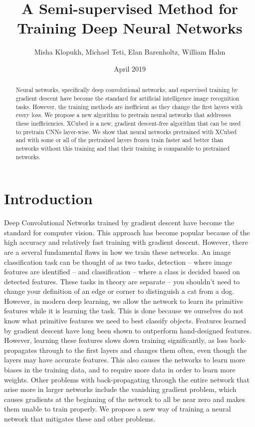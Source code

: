 \documentclass[twocolumn]{article}
\title{A Semi-supervised Method for Training Deep Neural Networks}
\author{Misha Klopukh, Michael Teti, Elan Barenholtz, William Hahn}
\date{April 2019}
\begin{document}
\maketitle




\begin{abstract}
    Neural networks, specifically deep convolutional networks, and supervised training by gradient descent have become the standard for artificial intelligence image recognition tasks. However, the training methods are inefficient as they change the first layers with every loss. We propose a new algorithm to pretrain neural networks that addresses these inefficiencies. XCubed is a new, gradient descent-free algorithm that can be used to pretrain CNNs layer-wise. We show that neural networks pretrained with XCubed and with some or all of the pretrained layers frozen train faster and better than networks without this training and that their training is comparable to pretrained networks.
\end{abstract}

\section{Introduction}

Deep Convolutional Networks trained by gradient descent have become the standard for computer vision. This approach has become popular because of the high accuracy and relatively fast training with gradient descent.\cite{alexnet}\cite{Lecun98gradient} However, there are a several fundamental flaws in how we train these networks. An image classification task can be thought of as two tasks, detection -- where image features are identified -- and classification -- where a class is decided based on detected features. These tasks in theory are separate -- you shouldn't need to change your definition of an edge or corner to distinguish a cat from a dog.\cite{cowardtowards} However, in modern deep learning, we allow the network to learn its primitive features while it is learning the task. This is done because we ourselves do not know what primitive features we need to best classify objects. Features learned by gradient descent have long been shown to outperform hand-designed features.\cite{learnvcraft} However, learning these features slows down training significantly, as loss back-propagates through to the first layers and changes them often, even though the layers may have accurate features. This also causes the networks to learn more biases in the training data, and to require more data in order to learn more weights. Other problems with back-propagating through the entire network that arise more in larger networks include the vanishing gradient problem, which causes gradients at the beginning of the network to all be near zero and makes them unable to train properly.\cite{vanishinggradients}\cite{learningproblems} We propose a new way of training a neural network that mitigates these and other problems.
\end{document}
